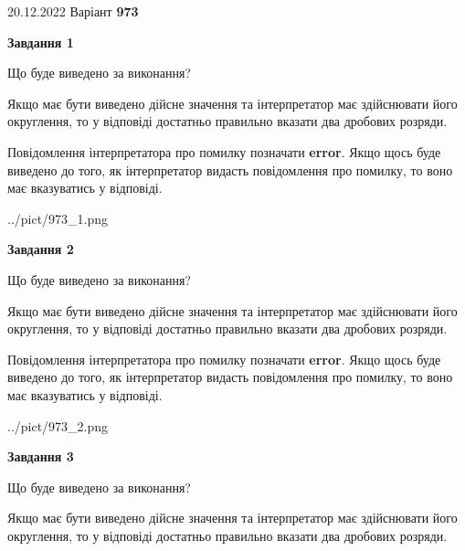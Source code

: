 \documentclass[12pt, ukrainian]{article}
\begin{document}
{20.12.2022 Варіант \No \textbf { 973 }\par}
{
\begin {Large}

{\begin {center}\textbf{Завдання 1}\end {center}}\par
Що буде виведено за виконання? \par

Якщо має бути виведено дійсне значення та інтерпретатор має здійснювати його округлення, 
то у відповіді достатньо правильно вказати два дробових розряди.

Повідомлення інтерпретатора про помилку позначати \textbf{error}.
Якщо щось буде виведено до того, як інтерпретатор видасть повідомлення про помилку, 
то воно має вказуватись у відповіді. \par

\begin{center}
	{../pict/973_1.png}
\end{center}
\newpage

{\begin {center}\textbf{Завдання 2}\end {center}}\par
Що буде виведено за виконання? \par

Якщо має бути виведено дійсне значення та інтерпретатор має здійснювати його округлення, 
то у відповіді достатньо правильно вказати два дробових розряди.

Повідомлення інтерпретатора про помилку позначати \textbf{error}.
Якщо щось буде виведено до того, як інтерпретатор видасть повідомлення про помилку, 
то воно має вказуватись у відповіді. \par

\begin{center}
	{../pict/973_2.png}
\end{center}
\newpage

{\begin {center}\textbf{Завдання 3}\end {center}}\par
Що буде виведено за виконання? \par

Якщо має бути виведено дійсне значення та інтерпретатор має здійснювати його округлення, 
то у відповіді достатньо правильно вказати два дробових розряди.


\end{Large}}
\end{document}
